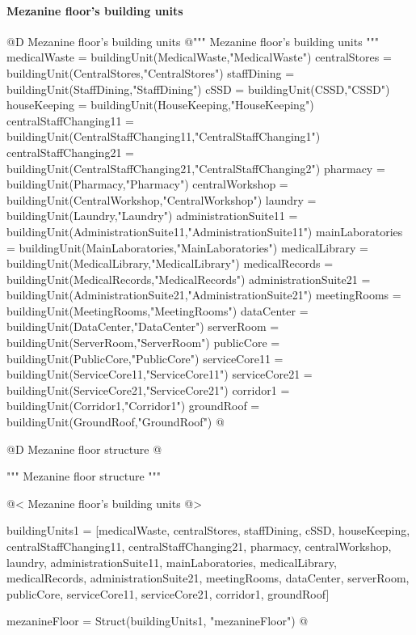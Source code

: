 \documentclass[11pt,oneside]{article}    %
\begin{document}
\paragraph{Mezanine floor's building units}
@D Mezanine floor's building units 
@{""" Mezanine floor's building units """
medicalWaste = buildingUnit(MedicalWaste,"MedicalWaste")
centralStores = buildingUnit(CentralStores,"CentralStores")
staffDining = buildingUnit(StaffDining,"StaffDining")
cSSD = buildingUnit(CSSD,"CSSD")
houseKeeping = buildingUnit(HouseKeeping,"HouseKeeping")
centralStaffChanging11 = buildingUnit(CentralStaffChanging11,"CentralStaffChanging1")
centralStaffChanging21 = buildingUnit(CentralStaffChanging21,"CentralStaffChanging2")
pharmacy = buildingUnit(Pharmacy,"Pharmacy")
centralWorkshop = buildingUnit(CentralWorkshop,"CentralWorkshop")
laundry = buildingUnit(Laundry,"Laundry")
administrationSuite11 = buildingUnit(AdministrationSuite11,"AdministrationSuite11")
mainLaboratories = buildingUnit(MainLaboratories,"MainLaboratories")
medicalLibrary = buildingUnit(MedicalLibrary,"MedicalLibrary")
medicalRecords = buildingUnit(MedicalRecords,"MedicalRecords")
administrationSuite21 = buildingUnit(AdministrationSuite21,"AdministrationSuite21")
meetingRooms = buildingUnit(MeetingRooms,"MeetingRooms")
dataCenter = buildingUnit(DataCenter,"DataCenter")
serverRoom = buildingUnit(ServerRoom,"ServerRoom")
publicCore = buildingUnit(PublicCore,"PublicCore")
serviceCore11 = buildingUnit(ServiceCore11,"ServiceCore11")
serviceCore21 = buildingUnit(ServiceCore21,"ServiceCore21")
corridor1 = buildingUnit(Corridor1,"Corridor1")
groundRoof = buildingUnit(GroundRoof,"GroundRoof")
@}

@D Mezanine floor structure
@{""" Mezanine floor structure """

@< Mezanine floor's building units @>

buildingUnits1 = [medicalWaste, centralStores, staffDining, cSSD, houseKeeping, 
    centralStaffChanging11, centralStaffChanging21, pharmacy, centralWorkshop, laundry, 
    administrationSuite11, mainLaboratories, medicalLibrary, medicalRecords, 
    administrationSuite21, meetingRooms, dataCenter, serverRoom, publicCore, 
    serviceCore11, serviceCore21, corridor1, groundRoof]
    
mezanineFloor = Struct(buildingUnits1, "mezanineFloor")
@}
\end{document}
